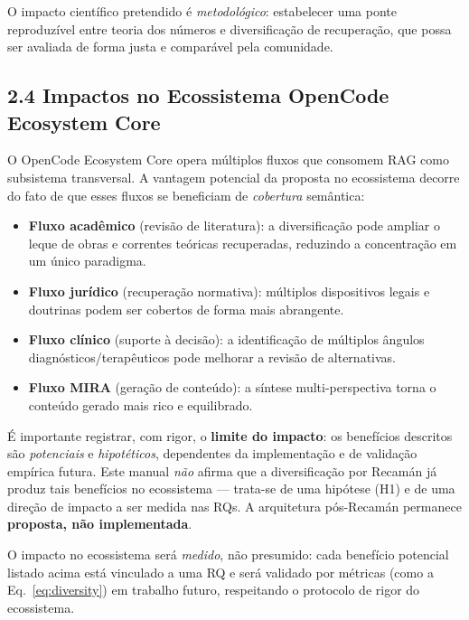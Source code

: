 \begin{pontochave}
O impacto científico pretendido é \emph{metodológico}: estabelecer uma ponte
reproduzível entre teoria dos números e diversificação de recuperação, que possa
ser avaliada de forma justa e comparável pela comunidade.
\end{pontochave}

\subsection*{2.4 Impactos no Ecossistema OpenCode Ecosystem Core}

 O OpenCode Ecosystem Core opera múltiplos fluxos que consomem RAG como
subsistema transversal. A vantagem potencial da proposta no ecossistema decorre do
fato de que esses fluxos se beneficiam de \emph{cobertura} semântica:

\begin{itemize}
  \item \textbf{Fluxo acadêmico} (revisão de literatura): a diversificação pode
        ampliar o leque de obras e correntes teóricas recuperadas, reduzindo a
        concentração em um único paradigma.
  \item \textbf{Fluxo jurídico} (recuperação normativa): múltiplos dispositivos
        legais e doutrinas podem ser cobertos de forma mais abrangente.
  \item \textbf{Fluxo clínico} (suporte à decisão): a identificação de múltiplos
        ângulos diagnósticos/terapêuticos pode melhorar a revisão de alternativas.
  \item \textbf{Fluxo MIRA} (geração de conteúdo): a síntese multi-perspectiva
        torna o conteúdo gerado mais rico e equilibrado.
\end{itemize}

 É importante registrar, com rigor, o \textbf{limite do impacto}: os
benefícios descritos são \emph{potenciais} e \emph{hipotéticos}, dependentes da
implementação e de validação empírica futura. Este manual \emph{não} afirma que a
diversificação por Recamán já produz tais benefícios no ecossistema --- trata-se
de uma hipótese (H1) e de uma direção de impacto a ser medida nas RQs. A
arquitetura pós-Recamán permanece \textbf{proposta, não implementada}.

\begin{pontochave}
O impacto no ecossistema será \emph{medido}, não presumido: cada benefício
potencial listado acima está vinculado a uma RQ e será validado por métricas
(como a Eq.~\ref{eq:diversity}) em trabalho futuro, respeitando o protocolo de
rigor do ecossistema.
\end{pontochave}

